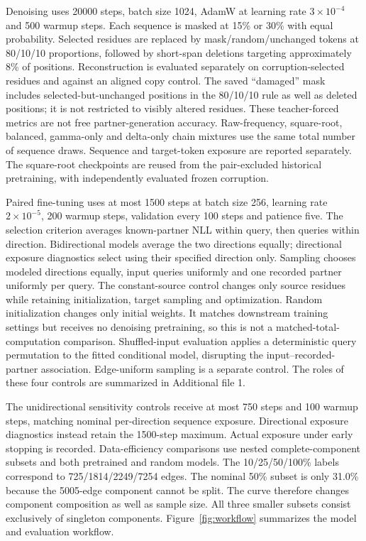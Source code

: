 \documentclass[12pt]{article}
\begin{document}
Denoising uses 20000 steps, batch size 1024, AdamW at learning rate
$3\times10^{-4}$ and 500 warmup steps. Each sequence is masked at 15\% or 30\%
with equal probability. Selected residues are replaced by mask/random/unchanged
tokens at 80/10/10 proportions, followed by short-span deletions targeting
approximately 8\% of positions. Reconstruction is evaluated separately on
corruption-selected residues and against an aligned copy control. The saved
``damaged'' mask includes selected-but-unchanged positions in the 80/10/10 rule
as well as deleted positions; it is not restricted to visibly altered residues.
These teacher-forced
metrics are not free partner-generation accuracy. Raw-frequency, square-root,
balanced, gamma-only and delta-only chain mixtures use the same total number of
sequence draws. Sequence and target-token exposure are reported separately.
The square-root checkpoints are reused from the pair-excluded historical
pretraining, with independently evaluated frozen corruption.

Paired fine-tuning uses at most 1500 steps at batch size 256, learning rate
$2\times10^{-5}$, 200 warmup steps, validation every 100 steps and patience five.
The selection criterion averages known-partner NLL within query, then queries
within direction. Bidirectional models average the two directions equally;
directional exposure diagnostics select using their specified direction only.
Sampling chooses modeled directions equally, input queries uniformly and one
recorded partner uniformly per query.
The constant-source control changes only source residues while retaining
initialization, target sampling and optimization. Random initialization changes only initial weights. It matches downstream
training settings but receives no denoising pretraining, so this is not a
matched-total-computation comparison. Shuffled-input evaluation applies a
deterministic query permutation to the fitted conditional model, disrupting the
input--recorded-partner association. Edge-uniform sampling is a separate control.
The roles of these four controls are summarized in Additional file 1.

The unidirectional sensitivity controls receive at most 750 steps and 100
warmup steps, matching nominal per-direction sequence exposure. Directional
exposure diagnostics instead retain the 1500-step maximum. Actual exposure under early
stopping is recorded. Data-efficiency comparisons use nested complete-component
subsets and both pretrained and random models. The 10/25/50/100\% labels
correspond to 725/1814/2249/7254 edges. The nominal 50\% subset is only 31.0\%
because the 5005-edge component cannot be split. The curve therefore changes
component composition as well as sample size.
All three smaller subsets consist exclusively of singleton components.
Figure~\ref{fig:workflow} summarizes the model and evaluation workflow.
\end{document}

